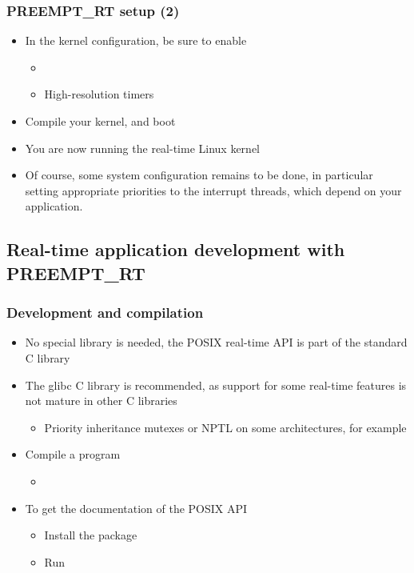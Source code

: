 \begin{frame}
  \frametitle{PREEMPT\_RT setup (2)}
  \begin{itemize}
  \item In the kernel configuration, be sure to enable
    \begin{itemize}
    \item {}
    \item High-resolution timers
    \end{itemize}
  \item Compile your kernel, and boot
  \item You are now running the real-time Linux kernel
  \item Of course, some system configuration remains to be done, in
    particular setting appropriate priorities to the interrupt
    threads, which depend on your application.
  \end{itemize}
\end{frame}

\subsection{Real-time application development with PREEMPT\_RT}

\begin{frame}
  \frametitle{Development and compilation}
  \begin{itemize}
  \item No special library is needed, the POSIX real-time API is part
    of the standard C library
  \item The glibc C library is recommended, as support
    for some real-time features is not mature in other C libraries
    \begin{itemize}
    \item Priority inheritance mutexes or NPTL on some architectures,
      for example
    \end{itemize}
  \item Compile a program
    \begin{itemize}
    \item {}
    \end{itemize}
  \item To get the documentation of the POSIX API
    \begin{itemize}
    \item Install the  package
    \item Run 
    \end{itemize}
  \end{itemize}
\end{frame}

